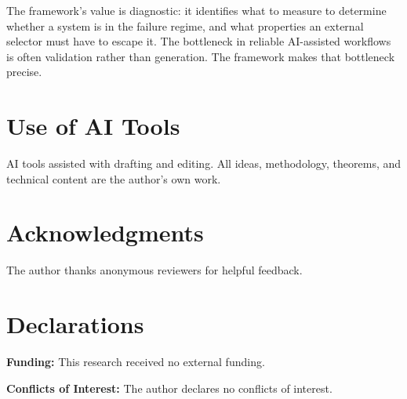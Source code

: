 \documentclass[11pt]{article}
\begin{document}
The framework's value is diagnostic: it identifies what to measure to determine whether a
system is in the failure regime, and what properties an external selector must have to
escape it. The bottleneck in reliable AI-assisted workflows is often validation rather than
generation. The framework makes that bottleneck precise.

\section*{Use of AI Tools}

AI tools assisted with drafting and editing. All ideas, methodology, theorems, and technical
content are the author's own work.

\section*{Acknowledgments}

The author thanks anonymous reviewers for helpful feedback.

\section*{Declarations}

\textbf{Funding:} This research received no external funding.

\textbf{Conflicts of Interest:} The author declares no conflicts of interest.
\end{document}
